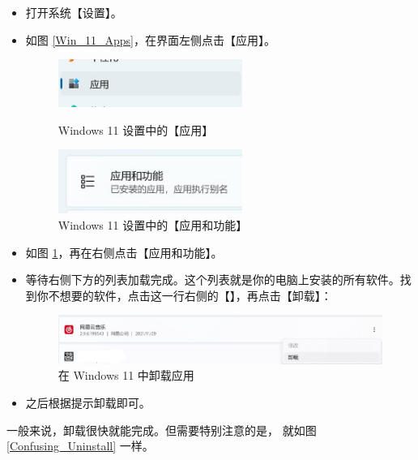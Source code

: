 \begin{itemize}
  \item 打开系统【设置】。
  \item 如图 \ref{Win_11_Apps}，在界面左侧点击【应用】。
    \begin{figure}[htb!]
      \centering
      \begin{minipage}{6.5cm}
        \centering
        \includegraphics[width=6cm]{assets/Win_11_Apps.jpg}
        \caption{Windows 11 设置中的【应用】}
        \label{Win_11_Apps}
      \end{minipage}
      \quad
      \begin{minipage}{7cm}
        \centering
        \includegraphics[width=6cm]{assets/Win_11_Apps_and_Functions.jpg}
        \caption{Windows 11 设置中的【应用和功能】}
        \label{Win_11_Apps_and_Functions}
      \end{minipage}
    \end{figure}
  \item 如图 \ref{Win_11_Apps_and_Functions}，再在右侧点击【应用和功能】。
  \item 等待右侧下方的列表加载完成。这个列表就是你的电脑上安装的所有软件。找到你不想要的软件，点击这一行右侧的【】，再点击【卸载】：
    \begin{figure}[htb!]
      \centering
      \includegraphics[width=13cm]{assets/Win_11_Unistall.jpg}
      \caption{在 Windows 11 中卸载应用}
      \label{Win_11_Unistall}
    \end{figure}
  \item 之后根据提示卸载即可。
\end{itemize}

一般来说，卸载很快就能完成。但需要特别注意的是，
就如图 \ref{Confusing_Uninstall} 一样。


